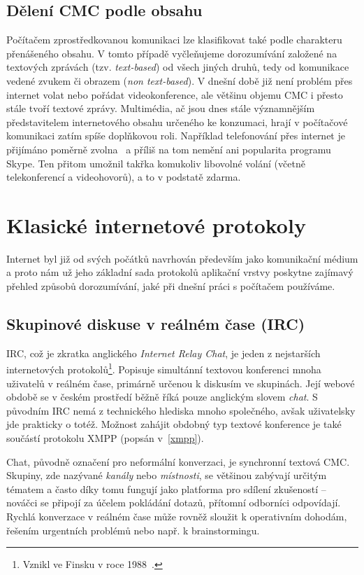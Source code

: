 \documentclass[12pt,oneside,final]{fithesis2}
\begin{document}
\subsection{Dělení CMC podle obsahu}
Počítačem zprostředkovanou komunikaci lze klasifikovat také podle charakteru přenášeného obsahu. V tomto případě vyčleňujeme dorozumívání založené na textových zprávách (tzv. \emph{text-based}) od všech jiných druhů, tedy od komunikace vedené zvukem či obrazem (\emph{non text-based}). V dnešní době již není problém přes internet volat nebo pořádat videokonference, ale většinu objemu CMC i přesto stále tvoří textové zprávy. Multimédia, ač jsou dnes stále významnějším představitelem internetového obsahu určeného ke konzumaci, hrají v počítačové komunikaci zatím spíše doplňkovou roli. Například telefonování přes internet je přijímáno poměrně zvolna~\cite{latif2007adoption} a příliš na tom nemění ani popularita programu Skype. Ten přitom umožnil takřka komukoliv libovolné volání (včetně telekonferencí a videohovorů), a to v podstatě zdarma.


\section{Klasické internetové protokoly}\label{protocols}
Internet byl již od svých počátků navrhován především jako komunikační médium a proto nám už jeho základní sada protokolů aplikační vrstvy poskytne zajímavý přehled způsobů dorozumívání, jaké při dnešní práci s počítačem používáme.

\subsection{Skupinové diskuse v reálném čase (IRC)}\label{irc}
IRC, což je zkratka anglického \emph{Internet Relay Chat}, je jeden z nejstarších internetových protokolů\footnote{Vznikl ve Finsku v roce 1988~\cite{oikarinen2011founding}.}. Popisuje simultánní textovou konferenci mnoha uživatelů v reálném čase, primárně určenou k diskusím ve skupinách. Její webové obdobě se v českém prostředí běžně říká pouze anglickým slovem \emph{chat}. S původním IRC nemá z technického hlediska mnoho společného, avšak uživatelsky jde prakticky o totéž. Možnost zahájit obdobný typ textové konference je také součástí protokolu XMPP (popsán v~\ref{xmpp}).

Chat, původně označení pro neformální konverzaci, je synchronní textová CMC. Skupiny, zde nazývané \emph{kanály} nebo \emph{místnosti}, se většinou zabývají určitým tématem a často díky tomu fungují jako platforma pro sdílení zkušeností -- nováčci se připojí za účelem pokládání dotazů, přítomní odborníci odpovídají. Rychlá konverzace v reálném čase může rovněž sloužit k operativním dohodám, řešením urgentních problémů nebo např. k brainstormingu.
\end{document}
